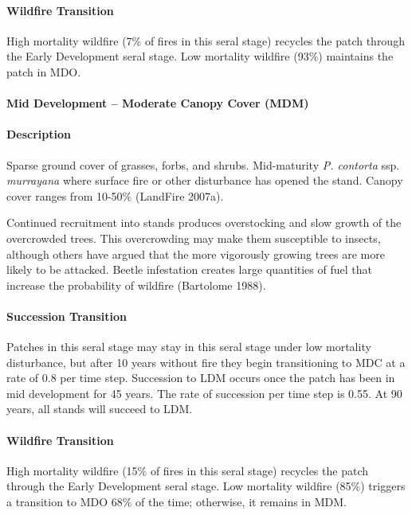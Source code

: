 \paragraph{Wildfire Transition} High mortality wildfire (7\% of fires in this seral stage) recycles the patch through the Early Development seral stage. Low mortality wildfire (93\%) maintains the patch in MDO.

\noindent\hrulefill

\paragraph{Mid Development – Moderate Canopy Cover (MDM)}

\paragraph{Description} Sparse ground cover of grasses, forbs, and shrubs. Mid-maturity \emph{P. contorta} ssp. \emph{murrayana} where surface fire or other disturbance has opened the stand. Canopy cover ranges from 10-50\% (LandFire 2007a).

Continued recruitment into stands produces overstocking and slow growth of the overcrowded trees. This overcrowding may make them susceptible to insects, although others have argued that the more vigorously growing trees are more likely to be attacked. Beetle infestation creates large quantities of fuel that increase the probability of wildfire (Bartolome 1988).


\paragraph{Succession Transition} Patches in this seral stage may stay in this seral stage under low mortality disturbance, but after 10 years without fire they begin transitioning to MDC at a rate of 0.8 per time step. Succession to LDM occurs once the patch has been in mid development for 45 years. The rate of succession per time step is 0.55. At 90 years, all stands will succeed to LDM.

\paragraph{Wildfire Transition} High mortality wildfire (15\% of fires in this seral stage) recycles the patch through the Early Development seral stage. Low mortality wildfire (85\%) triggers a transition to MDO 68\% of the time; otherwise, it remains in MDM.

